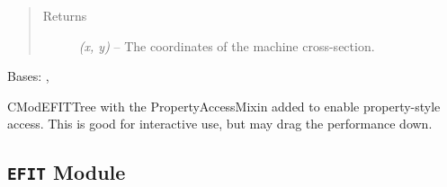 \documentclass[letterpaper,10pt,english]{sphinxmanual}
\begin{document}
\begin{fulllineitems}
\begin{fulllineitems}
\begin{quote}
\begin{description}
\item[{Returns}] \leavevmode
\emph{(x, y)} --
The coordinates of the machine cross-section.

\end{description}\end{quote}

\end{fulllineitems}


\end{fulllineitems}


\begin{fulllineitems}
\label{eqtools:eqtools.CModEFIT.CModEFITTreeProp}
Bases: {\hyperref[eqtools:eqtools.CModEFIT.CModEFITTree]{}}, {\hyperref[eqtools:eqtools.core.PropertyAccessMixin]{}}

CModEFITTree with the PropertyAccessMixin added to enable property-style
access. This is good for interactive use, but may drag the performance down.

\end{fulllineitems}



\subsection{\texttt{EFIT} Module}
\label{eqtools:efit-module}\label{eqtools:module-eqtools.EFIT}
\end{document}
